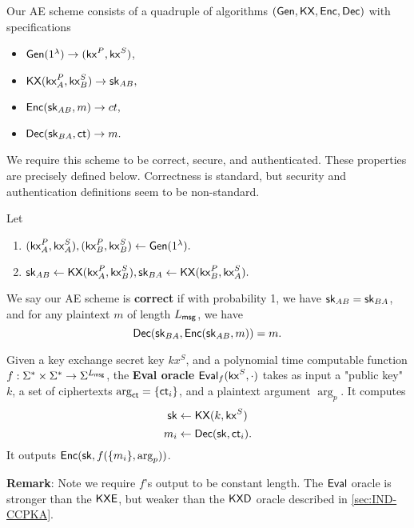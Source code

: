 Our AE scheme consists of a quadruple of algorithms $(\mathsf{Gen}, \mathsf{KX}, \mathsf{Enc}, \mathsf{Dec})$ with specifications
\begin{itemize}
    \item $\mathsf{Gen}(1^{\lambda}) \to (\mathsf{kx}^P, \mathsf{kx}^S)$,
    \item $\mathsf{KX}(\mathsf{kx}_A^P, \mathsf{kx}_B^S) \to {\ensuremath{\mathsf{sk}}}_{AB},$
    \item $\mathsf{Enc}({\mathsf{sk}}_{AB}, m) \to ct,$
    \item $\mathsf{Dec}({\mathsf{sk}}_{BA}, \mathsf{ct}) \to m.$
\end{itemize}
We require this scheme to be correct, secure, and authenticated. These properties are precisely defined below. Correctness is standard, but security and authentication definitions seem to be non-standard.
\begin{definition}
\label{defn:AE-correctness}
Let
\begin{enumerate}
    \item $(\mathsf{kx}^P_A, \mathsf{kx}_A^S), (\mathsf{kx}^P_B, \mathsf{kx}_B^S)  \leftarrow \mathsf{Gen}(1^{\lambda}).$
    \item ${\mathsf{sk}}_{AB} \leftarrow \mathsf{KX}(\mathsf{kx}_A^P,\mathsf{kx}_B^S), {\mathsf{sk}}_{BA} \leftarrow \mathsf{KX}(\mathsf{kx}_B^P, \mathsf{kx}_A^S).$
\end{enumerate}
We say our AE scheme is \textbf{correct} if with probability 1, we have ${\mathsf{sk}}_{AB} = {\mathsf{sk}}_{BA}$, and for any plaintext $m$ of length $L_{\mathsf{msg}}$, we have
$$\mathsf{Dec}({\mathsf{sk}}_{BA}, \mathsf{Enc}({\mathsf{sk}}_{AB}, m)) = m.$$
\end{definition}
\begin{definition}
\label{defn:AE-eval-oracle}
Given a key exchange secret key $kx^S$, and a polynomial time computable function $f: \Sigma^* \times \Sigma^* \to \Sigma^{L_{\mathsf{msg}}}$, the \textbf{Eval oracle} $\mathsf{Eval}_{f}(\mathsf{kx}^S, \cdot)$ takes as input a "public key" $k$, a set of ciphertexts $\arg_{\mathsf{ct}} = \{\mathsf{ct}_i\}$, and a plaintext argument $\arg_{p}$. It computes 
$${\mathsf{sk}} \leftarrow \mathsf{KX}(k, \mathsf{kx}^S)$$
$$m_i \leftarrow \mathsf{Dec}({\mathsf{sk}}, \mathsf{ct}_i).$$ 
It outputs $\mathsf{Enc}({\mathsf{sk}}, f(\{m_i\}, \arg_p))$.
\end{definition}
\textbf{Remark}: Note we require $f$'s output to be constant length. The $\mathsf{Eval}$ oracle is stronger than the $\mathsf{KXE}$, but weaker than the $\mathsf{KXD}$ oracle described in \cref{sec:IND-CCPKA}.
